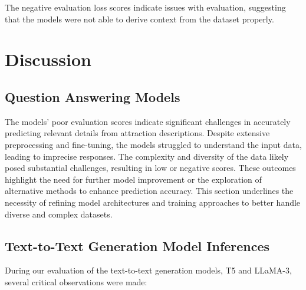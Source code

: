 \documentclass[conference]{IEEEtran}
\begin{document}
    The negative evaluation loss scores indicate issues with evaluation, suggesting that the models were not able to derive context from the dataset properly.


\section{Discussion}

    \subsection{Question Answering Models}

        The models' poor evaluation scores indicate significant challenges in accurately predicting relevant details from attraction descriptions. Despite extensive preprocessing and fine-tuning, the models struggled to understand the input data, leading to imprecise responses. The complexity and diversity of the data likely posed substantial challenges, resulting in low or negative scores. These outcomes highlight the need for further model improvement or the exploration of alternative methods to enhance prediction accuracy. This section underlines the necessity of refining model architectures and training approaches to better handle diverse and complex datasets.

    \subsection{Text-to-Text Generation Model Inferences}

        During our evaluation of the text-to-text generation models, T5 and LLaMA-3, several critical observations were made:
\end{document}
